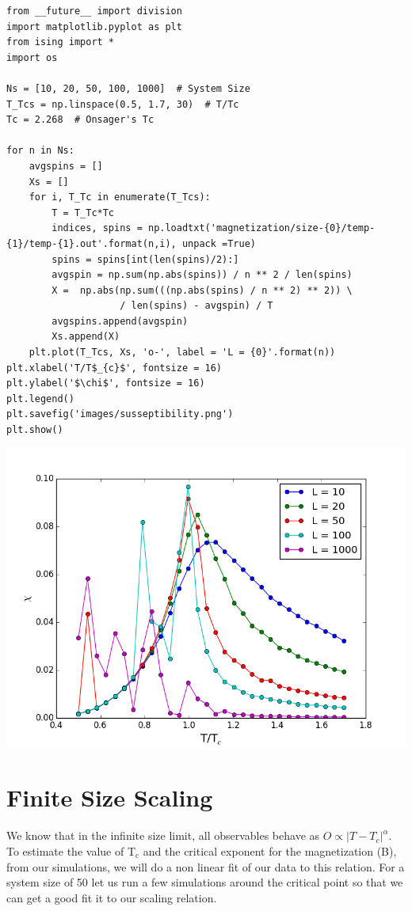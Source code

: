 \documentclass{article}
\begin{document}
\begin{verbatim}
from __future__ import division
import matplotlib.pyplot as plt
from ising import *
import os

Ns = [10, 20, 50, 100, 1000]  # System Size
T_Tcs = np.linspace(0.5, 1.7, 30)  # T/Tc
Tc = 2.268  # Onsager's Tc

for n in Ns:
    avgspins = []
    Xs = []
    for i, T_Tc in enumerate(T_Tcs):
        T = T_Tc*Tc
        indices, spins = np.loadtxt('magnetization/size-{0}/temp-{1}/temp-{1}.out'.format(n,i), unpack =True)
        spins = spins[int(len(spins)/2):]
        avgspin = np.sum(np.abs(spins)) / n ** 2 / len(spins)
        X =  np.abs(np.sum(((np.abs(spins) / n ** 2) ** 2)) \
                    / len(spins) - avgspin) / T
        avgspins.append(avgspin)
        Xs.append(X)
    plt.plot(T_Tcs, Xs, 'o-', label = 'L = {0}'.format(n))
plt.xlabel('T/T$_{c}$', fontsize = 16)
plt.ylabel('$\chi$', fontsize = 16)
plt.legend()
plt.savefig('images/susseptibility.png')
plt.show()
\end{verbatim}

\includegraphics[width=.9\linewidth]{./images/susseptibility.png}



\section{Finite Size Scaling}
\label{sec-6}

We know that in the infinite size limit, all observables behave as \( O \propto |T - T_{c}|^{\alpha}\). To estimate the value of T$_{\text{c}}$ and the critical exponent for the magnetization (B), from our simulations, we will do a non linear fit of our data to this relation. For a system size of 50 let us run a few simulations around the critical point so that we can get a good fit it to our scaling relation.
\end{document}
